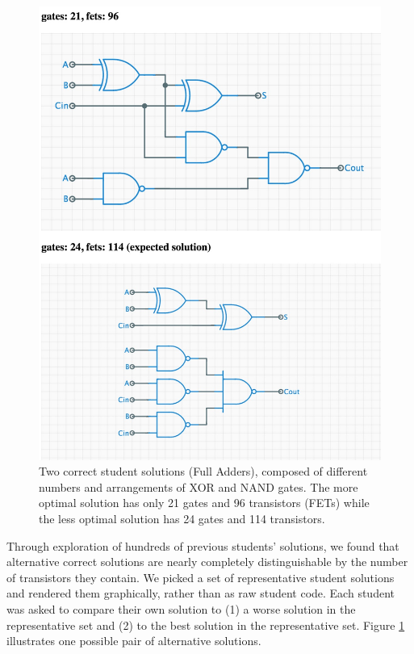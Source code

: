 \documentclass{sigchi}
\begin{document}
\begin{figure}[!h]
\centering
\includegraphics[width=1.0\columnwidth]{solutionComparison.jpg}
\caption{Two correct student solutions (Full Adders), composed of different numbers and arrangements of XOR and NAND gates. The more optimal solution has only 21 gates and 96 transistors (FETs) while the less optimal solution has 24 gates and 114 transistors.}
\label{fig:figure2}
\end{figure}

Through exploration of hundreds of previous students' solutions, we found that alternative correct solutions are nearly completely distinguishable by the number of transistors they contain. We picked a set of representative student solutions and rendered them graphically, rather than as raw student code. Each student was asked to compare their own solution to (1) a worse solution in the representative set and (2) to the best solution in the representative set. Figure \ref{fig:figure2} illustrates one possible pair of alternative solutions.
\end{document}
